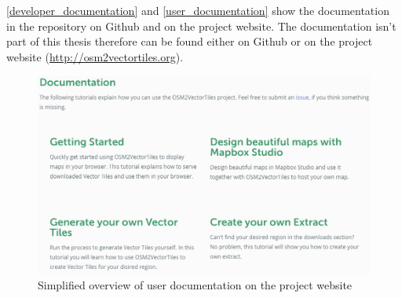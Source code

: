 \autoref{developer_documentation} and \autoref{user_documentation} show the documentation in the repository on Github and on the project website. The documentation isn't part of this thesis therefore can be found either on Github or on the project website (\url{http://osm2vectortiles.org}).

\begin{figure}[H]
  \centering
  \includegraphics[width=1.0\textwidth]{images/documentation/user_documentation}
  \caption{Simplified overview of user documentation on the project website}
  \label{user_documentation}
\end{figure}